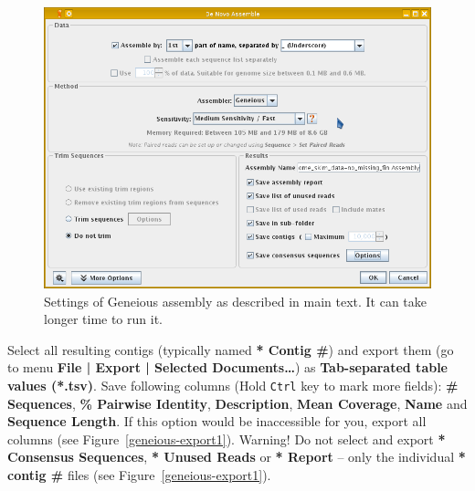 \documentclass[a4paper, 11pt, twoside]{article}
\begin{document}
\begin{figure}[htb]
  \begin{center}
    \includegraphics[width=12cm]{geneious2.png}
  \end{center}
  \caption[Settings of Geneious assembly]{Settings of Geneious assembly as described in main text. It can take longer time to run it.}
  \label{geneious-assembly}
\end{figure}

Select all resulting contigs (typically named \textbf{* Contig \#}) and export them (go to menu \textbf{File | Export | Selected Documents\ldots}) as \textbf{Tab-separated table values (*.tsv)}. Save following columns (Hold \texttt{Ctrl} key to mark more fields): \textbf{\# Sequences}, \textbf{\% Pairwise Identity}, \textbf{Description}, \textbf{Mean Coverage}, \textbf{Name} and \textbf{Sequence Length}. If this option would be inaccessible for you, export all columns (see Figure~\ref{geneious-export1}). Warning! Do not select and export \textbf{* Consensus Sequences}, \textbf{* Unused Reads} or \textbf{* Report} -- only the individual \textbf{* contig \#} files (see Figure~\ref{geneious-export1}).
\end{document}
